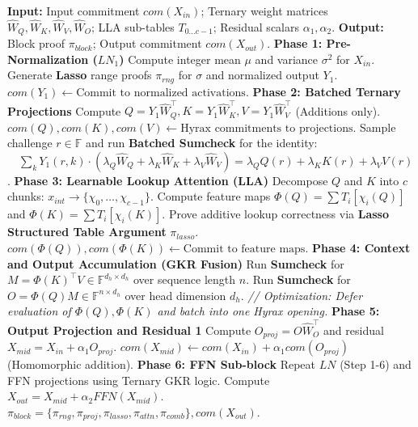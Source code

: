 \documentclass{article}
\renewcommand{\refname}{}
\begin{document}
\begin{algorithm}
\caption{$\pi$-Former Transformer Block Prover}
\begin{algorithmic}[1]
\State \textbf{Input:} Input commitment $com(X_{in})$; Ternary weight matrices $\hat{W}_Q, \hat{W}_K, \hat{W}_V, \hat{W}_O$; LLA sub-tables $T_{0 \dots c-1}$; Residual scalars $\alpha_1, \alpha_2$.
\State \textbf{Output:} Block proof $\pi_{block}$; Output commitment $com(X_{out})$.
\State \textbf{Phase 1: Pre-Normalization ($LN_1$)}
\State \indent Compute integer mean $\mu$ and variance $\sigma^2$ for $X_{in}$.
\State \indent Generate \textbf{Lasso} range proofs $\pi_{rng}$ for $\sigma$ and normalized output $Y_1$.
\State \indent $com(Y_1) \gets \text{Commit to normalized activations}$.
\State \textbf{Phase 2: Batched Ternary Projections}
\State \indent Compute $Q = Y_1 \hat{W}_Q^\top, K = Y_1 \hat{W}_K^\top, V = Y_1 \hat{W}_V^\top$ (Additions only).
\State \indent $com(Q), com(K), com(V) \gets \text{Hyrax commitments to projections}$.
\State \indent Sample challenge $r \in \mathbb{F}$ and run \textbf{Batched Sumcheck} for the identity: 
\State \indent $\quad \sum_k Y_1(r, k) \cdot (\lambda_Q \hat{W}_Q + \lambda_K \hat{W}_K + \lambda_V \hat{W}_V) = \lambda_Q Q(r) + \lambda_K K(r) + \lambda_V V(r)$.
\State \textbf{Phase 3: Learnable Lookup Attention (LLA)}
\State \indent Decompose $Q$ and $K$ into $c$ chunks: $x_{int} \to \{ \chi_0, \dots, \chi_{c-1} \}$.
\State \indent Compute feature maps $\Phi(Q) = \sum T_i[\chi_i(Q)]$ and $\Phi(K) = \sum T_i[\chi_i(K)]$.
\State \indent Prove additive lookup correctness via \textbf{Lasso Structured Table Argument} $\pi_{lasso}$.
\State \indent $com(\Phi(Q)), com(\Phi(K)) \gets \text{Commit to feature maps}$.
\State \textbf{Phase 4: Context and Output Accumulation (GKR Fusion)}
\State \indent Run \textbf{Sumcheck} for $M = \Phi(K)^\top V \in \mathbb{F}^{d_h \times d_h}$ over sequence length $n$.
\State \indent Run \textbf{Sumcheck} for $O = \Phi(Q)M \in \mathbb{F}^{n \times d_h}$ over head dimension $d_h$.
\State \indent \textit{// Optimization: Defer evaluation of $\Phi(Q), \Phi(K)$ and batch into one Hyrax opening.}
\State \textbf{Phase 5: Output Projection and Residual 1}
\State \indent Compute $O_{proj} = O \hat{W}_O^\top$ and residual $X_{mid} = X_{in} + \alpha_1 O_{proj}$.
\State \indent $com(X_{mid}) \gets com(X_{in}) + \alpha_1 com(O_{proj})$ (Homomorphic addition).
\State \textbf{Phase 6: FFN Sub-block}
\State \indent Repeat $LN$ (Step 1-6) and FFN projections using Ternary GKR logic.
\State \indent Compute $X_{out} = X_{mid} + \alpha_2 FFN(X_{mid})$.
\State \Return $\pi_{block} = \{ \pi_{rng}, \pi_{proj}, \pi_{lasso}, \pi_{attn}, \pi_{comb} \}, com(X_{out})$.
\end{algorithmic}
\end{algorithm}

\renewcommand{\refname}{References}



\appendix
\end{document}
